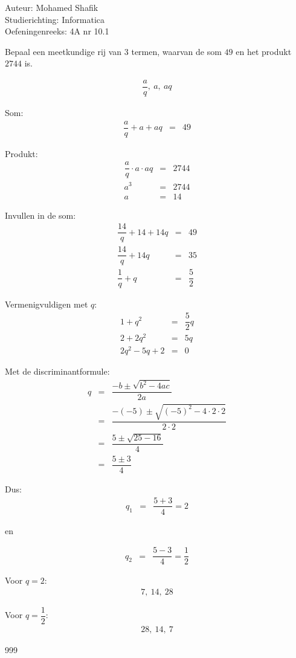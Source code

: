 \documentclass[a4paper]{article}
\begin{document}
\noindent \large Auteur: Mohamed Shafik \\
\noindent \large Studierichting: Informatica\\
\noindent \large Oefeningenreeks: 4A nr 10.1\\

\medskip

\normalsize

Bepaal een meetkundige rij van 3 termen, waarvan de som $49$ en het produkt $2744$ is.

\begin{eqnarray*}
\dfrac{a}{q},\ a,\ aq
\end{eqnarray*}

Som:
\begin{eqnarray*}
\dfrac{a}{q} + a + aq &=& 49
\end{eqnarray*}

Produkt:
\begin{eqnarray*}
\dfrac{a}{q} \cdot a \cdot aq &=& 2744 \\
a^3 &=& 2744 \\
a &=& 14
\end{eqnarray*}

Invullen in de som:
\begin{eqnarray*}
\dfrac{14}{q} + 14 + 14q &=& 49 \\
\dfrac{14}{q} + 14q &=& 35 \\
\dfrac{1}{q} + q &=& \dfrac{5}{2}
\end{eqnarray*}

Vermenigvuldigen met $q$:
\begin{eqnarray*}
1 + q^2 &=& \dfrac{5}{2}q \\
2 + 2q^2 &=& 5q \\
2q^2 - 5q + 2 &=& 0
\end{eqnarray*}

Met de discriminantformule:
\begin{eqnarray*}
q &=& \dfrac{-b \pm \sqrt{b^2-4ac}}{2a} \\
  &=& \dfrac{-(-5) \pm \sqrt{(-5)^2-4 \cdot 2 \cdot 2}}{2 \cdot 2} \\
  &=& \dfrac{5 \pm \sqrt{25-16}}{4} \\
  &=& \dfrac{5 \pm 3}{4}
\end{eqnarray*}

Dus:
\begin{eqnarray*}
q_1 &=& \dfrac{5+3}{4} = 2
\end{eqnarray*}

en

\begin{eqnarray*}
q_2 &=& \dfrac{5-3}{4} = \dfrac{1}{2}
\end{eqnarray*}

Voor $q=2$:
\begin{eqnarray*}
7,\ 14,\ 28
\end{eqnarray*}

Voor $q=\dfrac{1}{2}$:
\begin{eqnarray*}
28,\ 14,\ 7
\end{eqnarray*}

\begin{thebibliography}{999}
\end{thebibliography}
\end{document}
